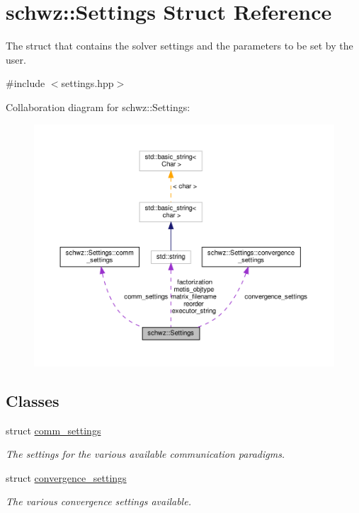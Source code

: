 \hypertarget{structschwz_1_1Settings}{}\section{schwz\+:\+:Settings Struct Reference}
\label{structschwz_1_1Settings}


The struct that contains the solver settings and the parameters to be set by the user.  




{\ttfamily \#include $<$settings.\+hpp$>$}



Collaboration diagram for schwz\+:\+:Settings\+:
\nopagebreak
\begin{figure}[H]
\begin{center}
\leavevmode
\includegraphics[width=350pt]{structschwz_1_1Settings__coll__graph}
\end{center}
\end{figure}
\subsection*{Classes}
\begin{DoxyCompactItemize}
\item 
struct \hyperlink{structschwz_1_1Settings_1_1comm__settings}{comm\+\_\+settings}
\begin{DoxyCompactList}\small\item\em The settings for the various available communication paradigms. \end{DoxyCompactList}\item 
struct \hyperlink{structschwz_1_1Settings_1_1convergence__settings}{convergence\+\_\+settings}
\begin{DoxyCompactList}\small\item\em The various convergence settings available. \end{DoxyCompactList}\end{DoxyCompactItemize}
